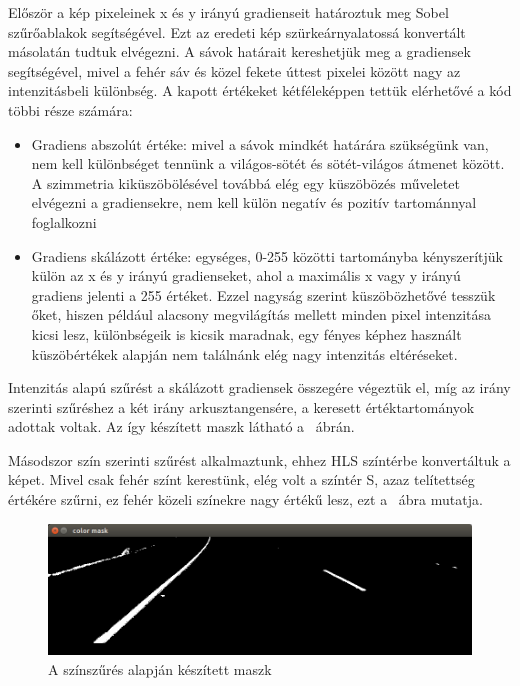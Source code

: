 Először a kép pixeleinek x és y irányú gradienseit határoztuk meg Sobel szűrőablakok segítségével. 
Ezt az eredeti kép szürkeárnyalatossá konvertált másolatán tudtuk elvégezni. 
A sávok határait kereshetjük meg a gradiensek segítségével, mivel a fehér sáv és közel fekete úttest pixelei között nagy az intenzitásbeli különbség. 
A kapott értékeket kétféleképpen tettük elérhetővé a kód többi része számára:
\begin{itemize}
	\item Gradiens abszolút értéke: mivel a sávok mindkét határára szükségünk van, nem kell különbséget tennünk a világos-sötét és sötét-világos átmenet között. A szimmetria kiküszöbölésével továbbá elég egy küszöbözés műveletet elvégezni a gradiensekre, nem kell külön negatív és pozitív tartománnyal foglalkozni
	\item Gradiens skálázott értéke: egységes, 0-255 közötti tartományba kényszerítjük külön az x és y irányú gradienseket, ahol a maximális x vagy y irányú gradiens jelenti a 255 értéket. Ezzel nagyság szerint küszöbözhetővé tesszük őket, hiszen például alacsony megvilágítás mellett minden pixel intenzitása kicsi lesz, különbségeik is kicsik maradnak, egy fényes képhez használt küszöbértékek alapján nem találnánk elég nagy intenzitás eltéréseket.
\end{itemize}
Intenzitás alapú szűrést a skálázott gradiensek összegére végeztük el, míg az irány szerinti szűréshez a két irány arkusztangensére, a keresett értéktartományok adottak voltak. Az így készített maszk látható a ~ábrán.


Másodszor szín szerinti szűrést alkalmaztunk, ehhez HLS színtérbe konvertáltuk a képet. Mivel csak fehér színt kerestünk, elég volt a színtér S, azaz telítettség értékére szűrni, ez fehér közeli színekre nagy értékű lesz, ezt a ~ábra mutatja.

\begin{figure}[!ht]
	\includegraphics[width=150mm,keepaspectratio]{figures/m09/color-mask.png}
	\caption{A színszűrés alapján készített maszk}
	\label{fig:ColorMask}
\end{figure}

